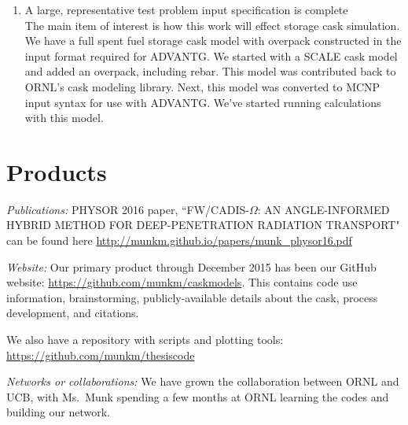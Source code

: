 \documentclass[12pt]{article}
\begin{document}
\begin{enumerate}
\item A large, representative test problem input specification is complete\\
The main item of interest is how this work will effect storage cask simulation. 
We have a full spent fuel storage cask model with overpack constructed in the input format required for ADVANTG. 
We started with a SCALE cask model and added an overpack, including rebar. 
This model was contributed back to ORNL's cask modeling library. 
Next, this model was converted to MCNP input syntax for use with ADVANTG.
We've started running calculations with this model.
\end{enumerate}



\section{Products}
\label{sect::products}
\textit{Publications:} PHYSOR 2016 paper, ``FW/CADIS-$\Omega$: AN ANGLE-INFORMED HYBRID METHOD FOR DEEP-PENETRATION RADIATION TRANSPORT" can be found here \url{http://munkm.github.io/papers/munk\_physor16.pdf}

\textit{Website:} Our primary product through December 2015 has been our GitHub website: \url{https://github.com/munkm/caskmodels}. This contains code use information, brainstorming, publicly-available details about the cask, process development, and citations. 

We also have a repository with scripts and plotting tools: \url{https://github.com/munkm/thesiscode}

\textit{Networks or collaborations:} We have grown the collaboration between ORNL and UCB, with Ms.\ Munk spending a few months at ORNL learning the codes and building our network.
\end{document}
